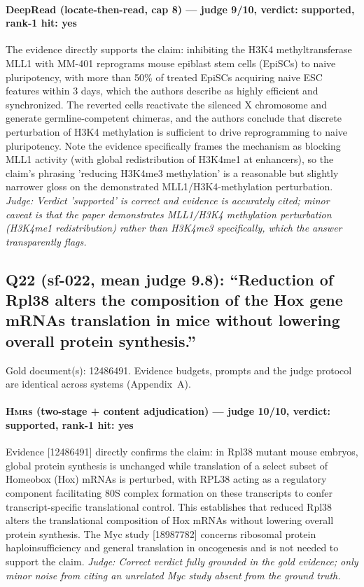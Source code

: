 \documentclass[sigconf, review, anonymous]{acmart}
\begin{document}
\paragraph{DeepRead (locate-then-read, cap 8) --- judge 9/10, verdict: supported, rank-1 hit: yes}
\noindent The evidence directly supports the claim: inhibiting the H3K4 methyltransferase MLL1 with MM-401 reprograms mouse epiblast stem cells (EpiSCs) to naive pluripotency, with more than 50\% of treated EpiSCs acquiring naive ESC features within 3 days, which the authors describe as highly efficient and synchronized. The reverted cells reactivate the silenced X chromosome and generate germline-competent chimeras, and the authors conclude that discrete perturbation of H3K4 methylation is sufficient to drive reprogramming to naive pluripotency. Note the evidence specifically frames the mechanism as blocking MLL1 activity (with global redistribution of H3K4me1 at enhancers), so the claim's phrasing 'reducing H3K4me3 methylation' is a reasonable but slightly narrower gloss on the demonstrated MLL1/H3K4-methylation perturbation.
\noindent\small\textit{Judge: Verdict 'supported' is correct and evidence is accurately cited; minor caveat is that the paper demonstrates MLL1/H3K4 methylation perturbation (H3K4me1 redistribution) rather than H3K4me3 specifically, which the answer transparently flags.}

\subsection{Q22 (sf-022, mean judge 9.8): ``Reduction of Rpl38 alters the composition of the Hox gene mRNAs translation in mice without lowering overall protein synthesis.''}
\label{app:q22}
\noindent Gold document(s): 12486491. Evidence budgets, prompts and the judge protocol are identical across systems (Appendix~A).
\paragraph{\textbf{\textsc{Hmrs}} (two-stage + content adjudication) --- judge 10/10, verdict: supported, rank-1 hit: yes}
\noindent Evidence [12486491] directly confirms the claim: in Rpl38 mutant mouse embryos, global protein synthesis is unchanged while translation of a select subset of Homeobox (Hox) mRNAs is perturbed, with RPL38 acting as a regulatory component facilitating 80S complex formation on these transcripts to confer transcript-specific translational control. This establishes that reduced Rpl38 alters the translational composition of Hox mRNAs without lowering overall protein synthesis. The Myc study [18987782] concerns ribosomal protein haploinsufficiency and general translation in oncogenesis and is not needed to support the claim.
\noindent\small\textit{Judge: Correct verdict fully grounded in the gold evidence; only minor noise from citing an unrelated Myc study absent from the ground truth.}
\end{document}
